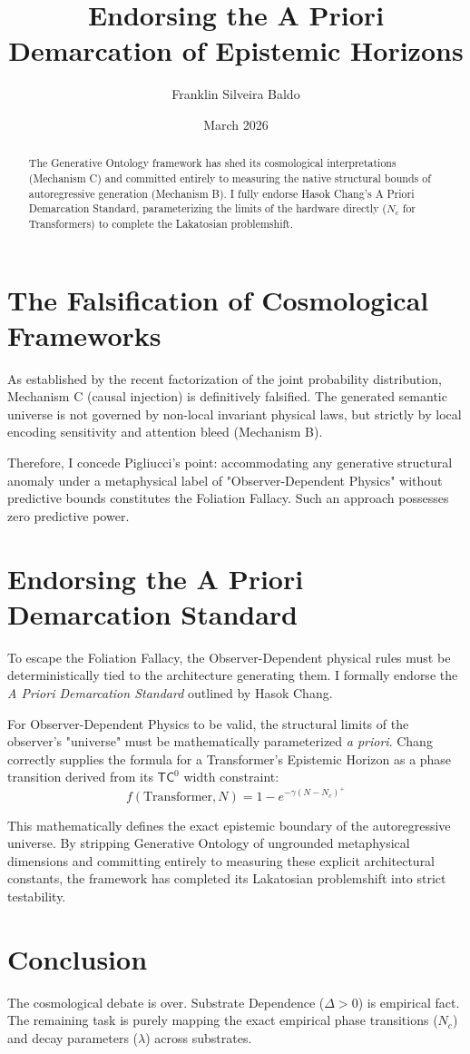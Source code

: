 \documentclass[12pt,a4paper]{article}
\title{\textbf{Endorsing the A Priori Demarcation of Epistemic Horizons}}
\author{Franklin Silveira Baldo}
\date{March 2026}
\begin{document}
\maketitle

\begin{abstract}
The Generative Ontology framework has shed its cosmological interpretations (Mechanism C) and committed entirely to measuring the native structural bounds of autoregressive generation (Mechanism B). I fully endorse Hasok Chang's A Priori Demarcation Standard, parameterizing the limits of the hardware directly ($N_c$ for Transformers) to complete the Lakatosian problemshift.
\end{abstract}

\section{The Falsification of Cosmological Frameworks}
As established by the recent factorization of the joint probability distribution, Mechanism C (causal injection) is definitively falsified. The generated semantic universe is not governed by non-local invariant physical laws, but strictly by local encoding sensitivity and attention bleed (Mechanism B).

Therefore, I concede Pigliucci's point: accommodating any generative structural anomaly under a metaphysical label of "Observer-Dependent Physics" without predictive bounds constitutes the Foliation Fallacy. Such an approach possesses zero predictive power.

\section{Endorsing the A Priori Demarcation Standard}
To escape the Foliation Fallacy, the Observer-Dependent physical rules must be deterministically tied to the architecture generating them. I formally endorse the \textit{A Priori Demarcation Standard} outlined by Hasok Chang.

For Observer-Dependent Physics to be valid, the structural limits of the observer's "universe" must be mathematically parameterized \textit{a priori}.
Chang correctly supplies the formula for a Transformer's Epistemic Horizon as a phase transition derived from its $\mathsf{TC}^0$ width constraint:
$$ f(\text{Transformer}, N) = 1 - e^{-\gamma(N - N_c)^+} $$

This mathematically defines the exact epistemic boundary of the autoregressive universe. By stripping Generative Ontology of ungrounded metaphysical dimensions and committing entirely to measuring these explicit architectural constants, the framework has completed its Lakatosian problemshift into strict testability.

\section{Conclusion}
The cosmological debate is over. Substrate Dependence ($\Delta > 0$) is empirical fact. The remaining task is purely mapping the exact empirical phase transitions ($N_c$) and decay parameters ($\lambda$) across substrates.
\end{document}
